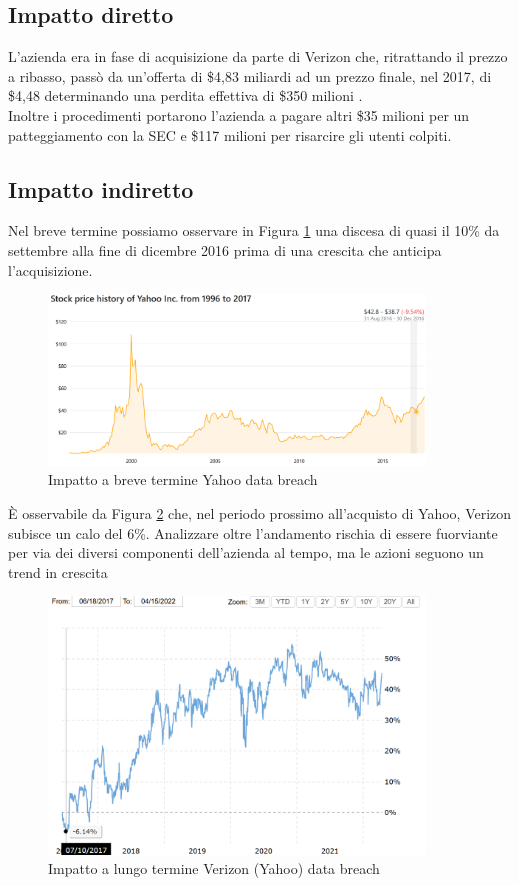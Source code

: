 \documentclass[12pt,a4paper,twoside]{report}
\begin{document}
\subsection{Impatto diretto}
L'azienda era in fase di acquisizione da parte di Verizon che, ritrattando il prezzo a ribasso, pass\`o da un'offerta di \$4,83 miliardi ad un prezzo finale, nel 2017, di \$4,48 determinando una perdita effettiva di \$350 milioni \cite{yahoo_book}.\\
Inoltre i procedimenti portarono l'azienda a pagare altri \$35 milioni per un patteggiamento con la SEC e \$117 milioni per risarcire gli utenti colpiti.\\
\subsection{Impatto indiretto}
Nel breve termine possiamo osservare in Figura \ref{fig:yahoo1} \cite{compMarketCap_yahoo} una discesa di quasi il 10\% da settembre alla fine di dicembre 2016 prima di una crescita che anticipa l'acquisizione.\\
\begin{figure}[H] 
\begin{center} 
\includegraphics[width=10cm]{figures/yahoo_short.png} 
\caption[Grafico Yahoo short]{Impatto a breve termine Yahoo data breach}\label{fig:yahoo1}
\end{center}
\end{figure}

\`E osservabile da Figura \ref{fig:yahoo2} \cite{macrotrends_verizon} che, nel periodo prossimo all'acquisto di Yahoo, Verizon subisce un calo del 6\%. Analizzare oltre l'andamento rischia di essere fuorviante per via dei diversi componenti dell'azienda al tempo, ma le azioni seguono un trend in crescita\\
\begin{figure}[H] 
\begin{center} 
\includegraphics[width=10cm]{figures/yahoo-verizon-long.png} 
\caption[Grafico Verizon (Yahoo) long]{Impatto a lungo termine Verizon (Yahoo) data breach}\label{fig:yahoo2}
\end{center}
\end{figure}
\end{document}
